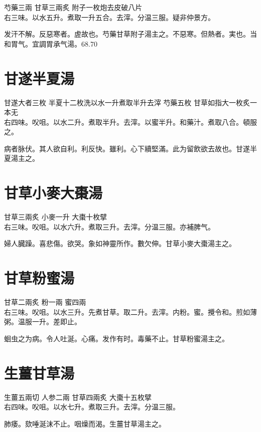 芍藥{\scriptsize 三兩} 甘草{\scriptsize 三兩炙} 附子{\scriptsize 一枚炮去皮破八片}\\
右三味。以水五升。煮取一升五合。去滓。分温三服。疑非仲景方。

发汗不解。反惡寒者。虗故也。芍藥甘草附子湯主之。不惡寒。但熱者。実也。当和胃气。宜調胃承气湯。68.70

\section{甘遂半夏湯}

甘遂{\scriptsize 大者三枚} 半夏{\scriptsize 十二枚洗以水一升煮取半升去滓} 芍藥{\scriptsize 五枚} 甘草{\scriptsize 如指大一枚炙一本无}\\
右四味。㕮咀。以水二升。煮取半升。去滓。以蜜半升。和藥汁。煮取八合。頓服之。

病者脉伏。其人欲自利。利反快。雖利。心下續堅滿。此为留飲欲去故也。甘遂半夏湯主之。

\section{甘草小麥大棗湯}

甘草{\scriptsize 三兩炙} 小麥{\scriptsize 一升} 大棗{\scriptsize 十枚擘}\\
右三味。㕮咀。以水六升。煮取三升。去滓。分温三服。亦補脾气。

婦人臓躁。喜悲傷。欲哭。象如神靈所作。數欠伸。甘草小麥大棗湯主之。

\section{甘草粉蜜湯}

甘草{\scriptsize 二兩炙} 粉{\scriptsize 一兩} 蜜{\scriptsize 四兩}\\
右三味。㕮咀。以水三升。先煮甘草。取二升。去滓。内粉。蜜。攪令和。煎如薄粥。温服一升。差即止。

蛔虫之为病。令人吐涎。心痛。发作有时。毒藥不止。甘草粉蜜湯主之。

\section{生薑甘草湯}

生薑{\scriptsize 五兩切} 人参{\scriptsize 二兩} 甘草{\scriptsize 四兩炙} 大棗{\scriptsize 十五枚擘}\\
右四味。㕮咀。以水七升。煮取三升。去滓。分温三服。

肺痿。欬唾涎沫不止。咽燥而渴。生薑甘草湯主之。

